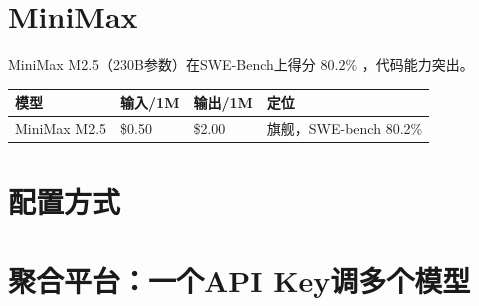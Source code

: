 \documentclass[
  10
]{article}
\newenvironment{Shaded}{}{}
\newcommand{\AttributeTok}[1]{\textcolor[rgb]{0.49,0.56,0.16}{#1}}
\newcommand{\DecValTok}[1]{\textcolor[rgb]{0.25,0.63,0.44}{#1}}
\newcommand{\FunctionTok}[1]{\textcolor[rgb]{0.02,0.16,0.49}{#1}}
\newcommand{\KeywordTok}[1]{\textcolor[rgb]{0.00,0.44,0.13}{\textbf{#1}}}
\newcommand{\StringTok}[1]{\textcolor[rgb]{0.25,0.44,0.63}{#1}}
\newcounter{none} %
\begin{document}
\section{MiniMax}\label{minimax}

MiniMax M2.5（230B参数）在SWE-Bench上得分 \(8 0 . 2 \%\)
，代码能力突出。

{\def\LTcaptype{none} %
\begin{longtable}[]{@{}|l|l|l|l|@{}}
\toprule\noalign{}
\endhead
\bottomrule\noalign{}
\endlastfoot
\hline
模型 & 输入/1M & 输出/1M & 定位 \\
\hline
MiniMax M2.5 & \$0.50 & \$2.00 & 旗舰，SWE-bench 80.2\% \\
\hline
\end{longtable}
}

\section{配置方式}\label{ux914dux7f6eux65b9ux5f0f-5}

\begin{Shaded}
\end{Shaded}

\section{聚合平台：一个API
Key调多个模型}\label{ux805aux5408ux5e73ux53f0ux4e00ux4e2aapi-keyux8c03ux591aux4e2aux6a21ux578b}
\end{document}
